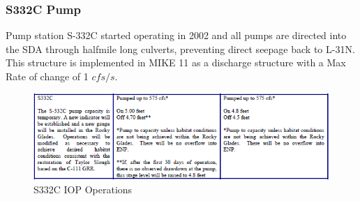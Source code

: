 %
%


\clearpage
\subsubsection{S332C Pump}
Pump station S-332C started operating in 2002 and all pumps are directed into the SDA through halfmile long culverts, preventing direct seepage back to L-31N. This structure is implemented in MIKE 11 as a discharge structure with a Max Rate of change of 1 $cfs/s$.


\begin{figure}[!h]
  \begin{center}
  \includegraphics[width=6.5in]{../figs/S332C_IOPops.png}
  \caption{S332C IOP Operations}
  \label{fig:S332Ciop}
  \end{center}
\end{figure}


